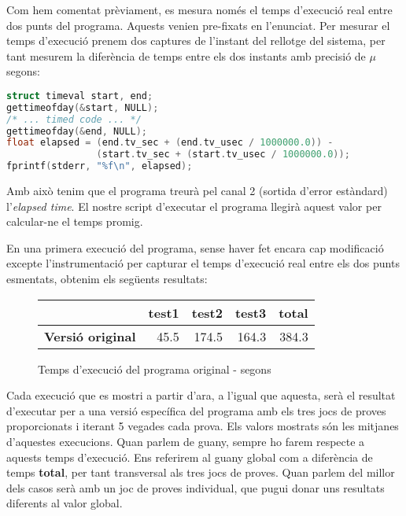 Com hem comentat prèviament, es mesura només el temps d'execució real entre dos punts del programa. Aquests venien pre-fixats en l'enunciat. Per mesurar el temps d'execució prenem dos captures de l'instant del rellotge del sistema, per tant mesurem la diferència de temps entre els dos instants amb precisió de $\mu$ segons:

\begin{lstlisting}[label=timer, caption=Mesura del temps d'execució real, language=C]
struct timeval start, end;
gettimeofday(&start, NULL);
/* ... timed code ... */
gettimeofday(&end, NULL);
float elapsed = (end.tv_sec + (end.tv_usec / 1000000.0)) -
                (start.tv_sec + (start.tv_usec / 1000000.0));
fprintf(stderr, "%f\n", elapsed);
\end{lstlisting}

Amb això tenim que el programa treurà pel canal 2 (sortida d'error estàndard) l'\emph{elapsed time}. El nostre script d'executar el programa llegirà aquest valor per calcular-ne el temps promig.

En una primera execució del programa, sense haver fet encara cap modificació excepte l'instrumentació per capturar el temps d'execució real entre els dos punts esmentats, obtenim els següents resultats:


\begin{figure}[ht]
  \caption{Temps d'execució del programa original - segons}\label{fig:elapsed_orig}
  \begin{center}
    \begin{tabular}{ l r r r r }
      & test1 & test2 & test3 & total \\
      \hline
      \textbf{Versió original} & 45.5 & 174.5 & 164.3 & 384.3 \\
    \end{tabular}
  \end{center}
\end{figure}

Cada execució que es mostri a partir d'ara, a l'igual que aquesta, serà el resultat d'executar per a una versió específica del programa amb els tres jocs de proves proporcionats i iterant 5 vegades cada prova. Els valors mostrats són les mitjanes d'aquestes execucions. Quan parlem de guany, sempre ho farem respecte a aquests temps d'execució. Ens referirem al guany global com a diferència de temps \textbf{total}, per tant transversal als tres jocs de proves. Quan parlem del millor dels casos serà amb un joc de proves individual, que pugui donar uns resultats diferents al valor global.
